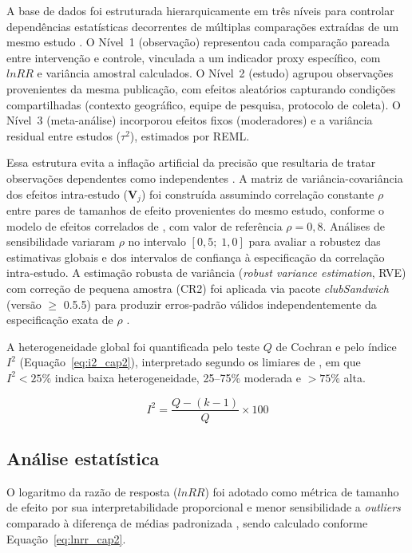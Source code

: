 A base de dados foi estruturada hierarquicamente em três níveis para controlar dependências estatísticas decorrentes de múltiplas comparações extraídas de um mesmo estudo \cite{Pustejovsky2022}. O Nível~1 (observação) representou cada comparação pareada entre intervenção e controle, vinculada a um indicador proxy específico, com $lnRR$ e variância amostral calculados. O Nível~2 (estudo) agrupou observações provenientes da mesma publicação, com efeitos aleatórios capturando condições compartilhadas (contexto geográfico, equipe de pesquisa, protocolo de coleta). O Nível~3 (meta-análise) incorporou efeitos fixos (moderadores) e a variância residual entre estudos ($\tau^2$), estimados por REML. 

Essa estrutura evita a inflação artificial da precisão que resultaria de tratar observações dependentes como independentes \cite{Cheung2014}. A matriz de variância-covariância dos efeitos intra-estudo ($\mathbf{V}_j$) foi construída assumindo correlação constante $\rho$ entre pares de tamanhos de efeito provenientes do mesmo estudo, conforme o modelo de efeitos correlados de , com valor de referência $\rho = 0{,}8$. Análises de sensibilidade variaram $\rho$ no intervalo $[0{,}5;\; 1{,}0]$ para avaliar a robustez das estimativas globais e dos intervalos de confiança à especificação da correlação intra-estudo. A estimação robusta de variância (\textit{robust variance estimation}, RVE) com correção de pequena amostra (CR2) foi aplicada via pacote \textit{clubSandwich} (versão $\geq$ 0.5.5) para produzir erros-padrão válidos independentemente da especificação exata de $\rho$ \cite{Pustejovsky2022}.

A heterogeneidade global foi quantificada pelo teste $Q$ de Cochran e pelo índice $I^2$ (Equação~\ref{eq:i2_cap2}), interpretado segundo os limiares de , em que $I^2 < 25\%$ indica baixa heterogeneidade, 25--75\% moderada e $> 75\%$ alta.

\begin{equation}
I^2 = \frac{Q - (k-1)}{Q} \times 100
\label{eq:i2_cap2}
\end{equation}

\subsection{Análise estatística}
\label{sec:stats_cap2}

O logaritmo da razão de resposta ($lnRR$) foi adotado como métrica de tamanho de efeito por sua interpretabilidade proporcional e menor sensibilidade a \textit{outliers} comparado à diferença de médias padronizada \cite{Hedges1999}, sendo calculado conforme Equação~\ref{eq:lnrr_cap2}.

